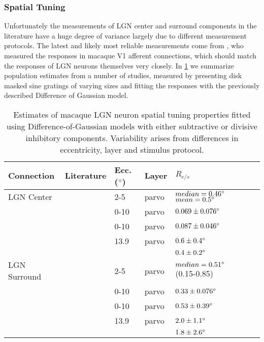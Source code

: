 \subsubsection{Spatial Tuning}

Unfortunately the measurements of LGN center and surround components
in the literature have a huge degree of variance largely due to
different measurement protocols. The latest and likely most reliable
measurements come from \citep{Sceniak2006}, who measured the responses
in macaque V1 afferent connections, which should match the responses
of LGN neurons themselves very closely.  In \ref{LGNEstimates} we
summarize population estimates from a number of studies, measured by
presenting disk masked sine gratings of varying sizes and fitting the
responses with the previously described Difference of Gaussian model.

\begin{table}
  \centering
  \begin{adjustbox}{width=1\textwidth}
  \begin{tabular}{l | l l l l l l}
    Connection   & Literature            & Ecc. ($\degree$) & Layer & $R_{c/s}$ \\
    \hline
    LGN Center   & \cite{Sceniak2006}    & 2-5  & parvo & $median = 0.46\degree$ $mean = 0.5\degree$ \\
                 & \cite{Levitt2001}     & 0-10 & parvo & $0.069 \pm 0.076\degree$ \\
                 & \cite{Spear1994}      & 0-10 & parvo & $0.087 \pm 0.046\degree$ \\
                 & \cite{Bonin2005}      & 13.9 & parvo & $0.6 \pm 0.4\degree$\\
                 &                       &      &       & $0.4 \pm 0.2\degree$ \\
    \hline
    LGN Surround & \cite{Sceniak2006}    & 2-5  & parvo & $median = 0.51\degree$ (0.15-0.85) \\
                 & \cite{Levitt2001}     & 0-10 & parvo & $0.33 \pm 0.076\degree$ \\
                 & \cite{Spear1994}      & 0-10 & parvo & $0.53 \pm 0.39\degree$ \\
                 & \cite{Bonin2005}      & 13.9 & parvo & $2.0 \pm 1.1\degree$\\
                 &                       &      &       & $1.8 \pm 2.6\degree$\\

    \hline
  \end{tabular}
  \end{adjustbox}
  \caption[Estimates of macaque LGN spatial tuning.]{Estimates of
    macaque LGN neuron spatial tuning properties fitted using
    Difference-of-Gaussian models with either subtractive or divisive
    inhibitory components. Variability arises from differences in
    eccentricity, layer and stimulus protocol.}
  \label{LGNEstimates}
\end{table}

